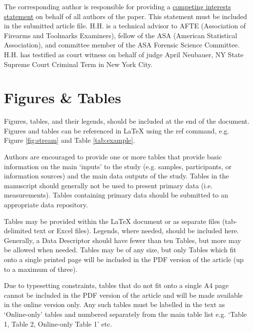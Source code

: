 \documentclass[fleqn,10pt]{wlscirep}
\begin{document}
The corresponding author is responsible for providing a
\href{https://www.nature.com/sdata/policies/editorial-and-publishing-policies#competing}{competing interests statement}
on behalf of all authors of the paper. This statement must be included
in the submitted article file. H.H. is a technical advisor to AFTE
(Association of Firearms and Toolmarks Examiners), fellow of the ASA
(American Statistical Association), and committee member of the ASA
Forensic Science Committee. H.H. has testified as court witness on
behalf of judge April Neubauer, NY State Supreme Court Criminal Term in
New York City.

\section*{Figures \& Tables}


Figures, tables, and their legends, should be included at the end of the document. Figures and tables can be referenced in \LaTeX{} using the ref command, e.g. Figure \ref{fig:stream} and Table \ref{tab:example}. 

Authors are encouraged to provide one or more tables that provide basic information on the main ‘inputs’ to the study (e.g. samples, participants, or information sources) and the main data outputs of the study. Tables in the manuscript should generally not be used to present primary data (i.e. measurements). Tables containing primary data should be submitted to an appropriate data repository.

Tables may be provided within the \LaTeX{} document or as separate files (tab-delimited text or Excel files). Legends, where needed, should be included here. Generally, a Data Descriptor should have fewer than ten Tables, but more may be allowed when needed. Tables may be of any size, but only Tables which fit onto a single printed page will be included in the PDF version of the article (up to a maximum of three). 

Due to typesetting constraints, tables that do not fit onto a single A4 page cannot be included in the PDF version of the article and will be made available in the online version only. Any such tables must be labelled in the text as ‘Online-only’ tables and numbered separately from the main table list e.g. ‘Table 1, Table 2, Online-only Table 1’ etc.
\end{document}
